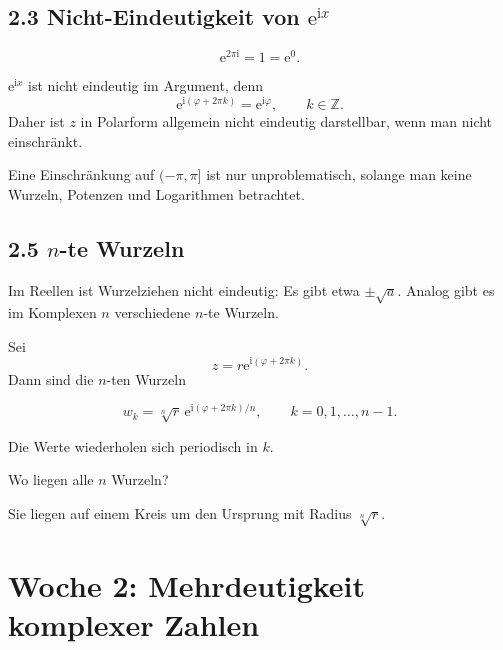 \documentclass[11pt,a4paper]{article}
\newcommand{\Z}{\mathbb Z}
\newcommand{\ii}{\mathrm i}
\newcommand{\ee}{\mathrm e}
\begin{document}
\subsection{2.3 Nicht-Eindeutigkeit von $\ee^{\ii x}$}
\[
\ee^{2\pi\ii}=1=\ee^0.
\]
\begin{importantbox}
$\ee^{\ii x}$ ist nicht eindeutig im Argument, denn
\[
\ee^{\ii(\varphi+2\pi k)}=\ee^{\ii\varphi},\qquad k\in\Z.
\]
Daher ist $z$ in Polarform allgemein nicht eindeutig darstellbar, wenn man nicht einschränkt.
\end{importantbox}
Eine Einschränkung auf $(-\pi,\pi]$ ist nur unproblematisch, solange man keine Wurzeln, Potenzen und Logarithmen betrachtet.

\subsection{2.5 $n$-te Wurzeln}
Im Reellen ist Wurzelziehen nicht eindeutig: Es gibt etwa $\pm\sqrt a$. Analog gibt es im Komplexen $n$ verschiedene $n$-te Wurzeln.

Sei
\[
z=r\ee^{\ii(\varphi+2\pi k)}.
\]
Dann sind die $n$-ten Wurzeln
\begin{importantbox}
\[
w_k=\sqrt[n]{r}\,\ee^{\ii(\varphi+2\pi k)/n},\qquad k=0,1,\ldots,n-1.
\]
\end{importantbox}
Die Werte wiederholen sich periodisch in $k$.

\begin{fragebox}
Wo liegen alle $n$ Wurzeln?
\end{fragebox}
\begin{antwortbox}
Sie liegen auf einem Kreis um den Ursprung mit Radius $\sqrt[n]{r}$.
\end{antwortbox}

\begin{center}
\end{center}

\section{Woche 2: Mehrdeutigkeit komplexer Zahlen}
\end{document}
